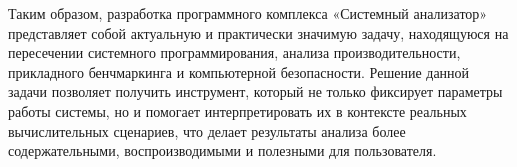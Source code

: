 Таким образом, разработка программного комплекса «Системный анализатор» представляет собой актуальную и практически значимую задачу, находящуюся на пересечении системного программирования, анализа производительности, прикладного бенчмаркинга и компьютерной безопасности. Решение данной задачи позволяет получить инструмент, который не только фиксирует параметры работы системы, но и помогает интерпретировать их в контексте реальных вычислительных сценариев, что делает результаты анализа более содержательными, воспроизводимыми и полезными для пользователя.

